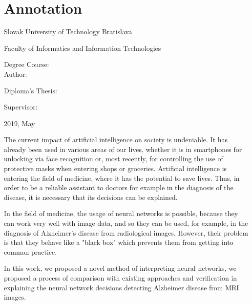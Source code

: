 
\thispagestyle{empty}

\section*{Annotation}

\begin{minipage}[t]{1\columnwidth}%
Slovak University of Technology Bratislava 

Faculty of Informatics and Information Technologies

Degree Course: \myStudyProgramEng\\

Author: \myName

Diploma's Thesis: \myTitleEng

Supervisor: \mySupervisorEng

2019, May
\end{minipage}

\bigskip{}

The current impact of artificial intelligence on society is undeniable. It has already been used in various areas of our lives, whether it is in smartphones for unlocking via face recognition or, most recently, for controlling the use of protective masks when entering shops or groceries. Artificial intelligence is entering the field of medicine, where it has the potential to save lives. Thus, in order to be a reliable assistant to doctors for example in the diagnosis of the disease, it is necessary that its decisions can be explained.

In the field of medicine, the usage of neural networks is possible, because they can work very well with image data, and so they can be used, for example, in the diagnosis of Alzheimer's disease from radiological images. However, their problem is that they behave like a "black box" which prevents them from getting into common practice.

In this work, we proposed a novel method of interpreting neural networks, we proposed a process of comparison with existing approaches and verification in explaining the neural network decisions detecting Alzheimer disease from MRI images.

\newpage
\thispagestyle{empty}
\mbox{}
\newpage